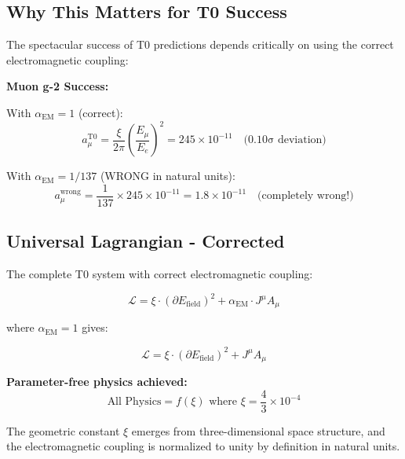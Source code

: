 \documentclass[12pt,a4paper]{report}
\begin{document}
\subsection{Why This Matters for T0 Success}
\label{subsec:why_this_matters}

The spectacular success of T0 predictions depends critically on using the correct electromagnetic coupling:

\begin{tcolorbox}[colback=green!10!white,colframe=green!75!black,title=T0 SUCCESS EXPLAINED]
	\textbf{Muon g-2 Success:}
	
	With $\alpha_{\text{EM}} = 1$ (correct):
	\begin{equation}
		a_\mu^{\text{T0}} = \frac{\xi}{2\pi} \left(\frac{E_\mu}{E_e}\right)^2 = 245 \times 10^{-11} \quad \text{(0.10σ deviation)}
	\end{equation}
	
	With $\alpha_{\text{EM}} = 1/137$ (WRONG in natural units):
	\begin{equation}
		a_\mu^{\text{wrong}} = \frac{1}{137} \times 245 \times 10^{-11} = 1.8 \times 10^{-11} \quad \text{(completely wrong!)}
	\end{equation}
\end{tcolorbox}

\subsection{Universal Lagrangian - Corrected}
\label{subsec:universal_lagrangian_corrected}

The complete T0 system with correct electromagnetic coupling:

\begin{equation}
	\boxed{\mathcal{L} = \xi \cdot (\partial E_{\text{field}})^2 + \alpha_{\text{EM}} \cdot J^\mu A_\mu}
\end{equation}

where $\alpha_{\text{EM}} = 1$ gives:

\begin{equation}
	\mathcal{L} = \xi \cdot (\partial E_{\text{field}})^2 + J^\mu A_\mu
\end{equation}

\textbf{Parameter-free physics achieved:}
\begin{equation}
	\boxed{\text{All Physics} = f(\xi) \text{ where } \xi = \frac{4}{3} \times 10^{-4}}
\end{equation}

The geometric constant $\xi$ emerges from three-dimensional space structure, and the electromagnetic coupling is normalized to unity by definition in natural units.
\end{document}
